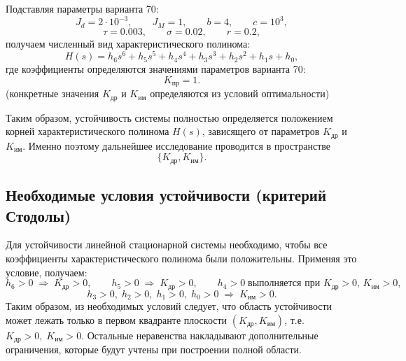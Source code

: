\documentclass[a4paper, 14pt]{extarticle}
\begin{document}
Подставляя параметры варианта 70:
\[
    J_d=2\cdot10^{-3},
    \qquad
    J_M=1,
    \qquad
    b=4,
    \qquad
    c=10^3,
\]
\[
    \tau=0.003,
    \qquad
    \sigma=0.02,
    \qquad
    r=0.2,
\]
получаем численный вид характеристического полинома:
\[
    H(s)=
    h_6 s^6+
    h_5 s^5+
    h_4 s^4+
    h_3 s^3+
    h_2 s^2+
    h_1 s+
    h_0,
\]
где коэффициенты определяются значениями параметров варианта 70:
\[
    K_{\text{пр}}=1.
\]
(конкретные значения $K_{\text{др}}$ и $K_{\text{им}}$ определяются из условий оптимальности)

Таким образом, устойчивость системы полностью определяется положением корней характеристического полинома \(H(s)\), зависящего от параметров \(K_{\text{др}}\) и \(K_{\text{им}}\). Именно поэтому дальнейшее исследование проводится в пространстве
\[
    \{K_{\text{др}},K_{\text{им}}\}.
\]

\subsection{Необходимые условия устойчивости (критерий Стодолы)}
Для устойчивости линейной стационарной системы необходимо, чтобы все коэффициенты характеристического полинома были положительны. Применяя это условие, получаем:
\[
    h_6>0 \;\Rightarrow\; K_{\text{др}}>0, \qquad h_5>0 \;\Rightarrow\; K_{\text{др}}>0, \qquad h_4>0 \;\text{выполняется при } K_{\text{др}}>0,\,K_{\text{им}}>0,
\]
\[
    h_3>0,\; h_2>0,\; h_1>0,\; h_0>0 \;\Rightarrow\; K_{\text{им}}>0.
\]
Таким образом, из необходимых условий следует, что область устойчивости может лежать только в первом квадранте плоскости \((K_{\text{др}},K_{\text{им}})\), т.е. \(K_{\text{др}}>0,\;K_{\text{им}}>0\). Остальные неравенства накладывают дополнительные ограничения, которые будут учтены при построении полной области.
\end{document}
